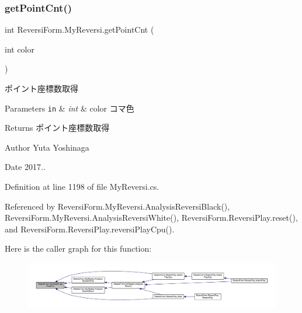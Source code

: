 \subsubsection{\texorpdfstring{get\+Point\+Cnt()}{getPointCnt()}}
{\footnotesize\ttfamily int Reversi\+Form.\+My\+Reversi.\+get\+Point\+Cnt (\begin{DoxyParamCaption}\item[{int}]{color }\end{DoxyParamCaption})}



ポイント座標数取得 


\begin{DoxyParams}[1]{Parameters}
\mbox{\tt in}  & {\em int} & color コマ色 \\
\hline
\end{DoxyParams}
\begin{DoxyReturn}{Returns}
ポイント座標数取得 
\end{DoxyReturn}
\begin{DoxyAuthor}{Author}
Yuta Yoshinaga 
\end{DoxyAuthor}
\begin{DoxyDate}{Date}
2017.. 
\end{DoxyDate}


Definition at line 1198 of file My\+Reversi.\+cs.



Referenced by Reversi\+Form.\+My\+Reversi.\+Analysis\+Reversi\+Black(), Reversi\+Form.\+My\+Reversi.\+Analysis\+Reversi\+White(), Reversi\+Form.\+Reversi\+Play.\+reset(), and Reversi\+Form.\+Reversi\+Play.\+reversi\+Play\+Cpu().

Here is the caller graph for this function\+:
\nopagebreak
\begin{figure}[H]
\begin{center}
\leavevmode
\includegraphics[width=350pt]{class_reversi_form_1_1_my_reversi_a7b5ebbdd9b7ff56d72185e6b89a50af8_icgraph}
\end{center}
\end{figure}
\mbox{\label{class_reversi_form_1_1_my_reversi_a379ac04ab0e8e9fc819ef3ceeba63e58}} 
